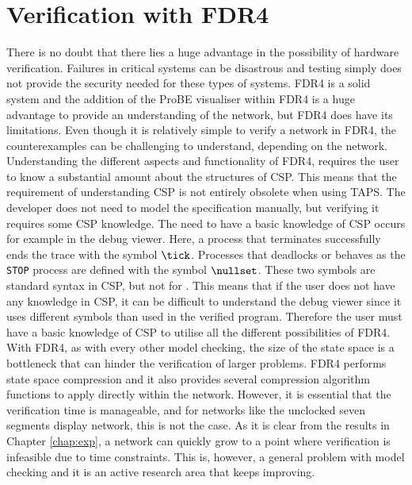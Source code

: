 \section{Verification with FDR4}
There is no doubt that there lies a huge advantage in the possibility of hardware verification. Failures in critical systems can be disastrous and testing simply does not provide the security needed for these types of systems. FDR4 is a solid system and the addition of the ProBE visualiser within FDR4 is a huge advantage to provide an understanding of the network, but FDR4 does have its limitations. Even though it is relatively simple to verify a network in FDR4, the counterexamples can be challenging to understand, depending on the network. Understanding the different aspects and functionality of FDR4, requires the user to know a substantial amount about the structures of CSP. This means that the requirement of understanding CSP is not entirely obsolete when using TAPS. The developer does not need to model the specification manually, but verifying it requires some CSP knowledge. The need to have a basic knowledge of CSP occurs for example in the debug viewer. Here, a process that terminates successfully ends the trace with the symbol $\tick$. Processes that deadlocks or behaves as the \texttt{STOP} process are defined with the symbol $\nullset$. These two symbols are standard syntax in CSP, but not for \cspm{}. This means that if the user does not have any knowledge in CSP, it can be difficult to understand the debug viewer since it uses different symbols than used in the verified \cspm{} program. Therefore the user must have a basic knowledge of CSP to utilise all the different possibilities of FDR4. \\

With FDR4, as with every other model checking, the size of the state space is a bottleneck that can hinder the verification of larger problems. FDR4 performs state space compression and it also provides several compression algorithm functions to apply directly within the \cspm{} network.
However, it is essential that the verification time is manageable, and for networks like the unclocked seven segments display network, this is not the case. As it is clear from the results in Chapter \ref{chap:exp}, a network can quickly grow to a point where verification is infeasible due to time constraints. This is, however, a general problem with model checking and it is an active research area that keeps improving.